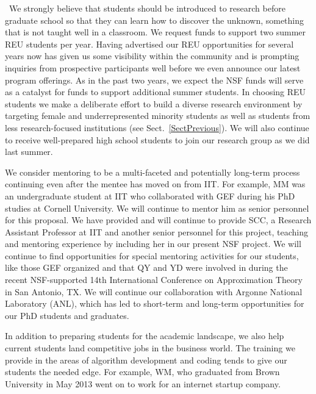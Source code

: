\documentclass[11pt]{NSFamsart}
\begin{document}
\begin{description}[leftmargin=0ex]
\item[Providing Research Experiences for Undergraduates and High School Students]\ We \linebreak[4]    strongly believe that students should be introduced to research before graduate school so that they can learn how to discover the unknown, something that is not taught well in a classroom. We request funds to support two summer REU students per year. Having advertised our REU opportunities for several years now has given us some visibility within the community and is prompting inquiries from prospective participants well before we even announce our latest program offerings. As in the past two years, we expect the NSF funds will serve as a catalyst for funds to support additional summer students. In choosing REU students we make a deliberate effort to build a diverse research environment by targeting female and underrepresented minority students as well as students from less research-focused institutions (see Sect.~\ref{SectPrevious}). We will also continue to receive well-prepared high school students to join our research group as we did last summer.

\item[Preparing Students for Academic Careers] We consider mentoring to be a multi-faceted and potentially long-term process continuing even after the mentee has moved on from IIT.  For example, MM was an undergraduate student at IIT who collaborated with GEF during his PhD studies at Cornell University.  We will continue to mentor him as senior personnel for this proposal. 
    We have provided and will continue to provide SCC, a Research Assistant Professor at IIT and another senior personnel for this project, teaching and mentoring experience by including her in our present NSF project.  We will continue to find opportunities for special mentoring activities for our students, like those GEF organized and that QY and YD were involved in during the recent NSF-supported 14th International Conference on Approximation Theory in San Antonio, TX.  We  will continue our collaboration with Argonne National Laboratory (ANL), which has led to short-term and long-term opportunities for our PhD students and graduates.

\item[Preparing Students for Industry Careers]
In addition to preparing students for the academic landscape, we also help current students land competitive jobs in the business world. The training we provide in the areas of algorithm development and coding tends to give our students the needed edge. For example, WM, who graduated from Brown University in May 2013 went on to work for an internet startup company.


\end{description}
\end{document}
